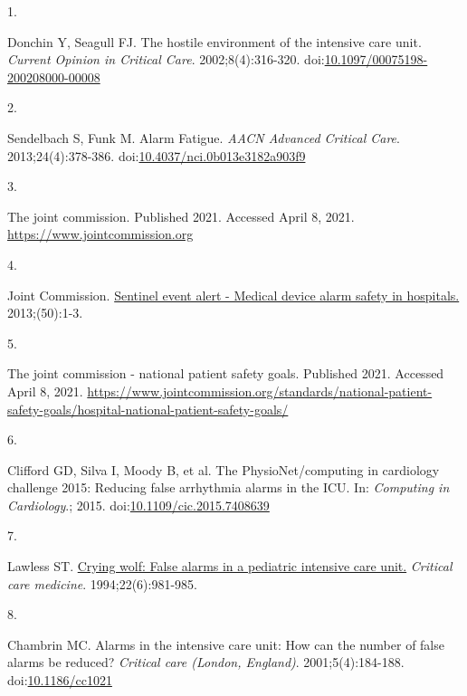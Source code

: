 \documentclass[12pt,twoside]{fmupthesis}
\newlength{\csllabelwidth}
\newlength{\cslhangindent}
\newenvironment{CSLReferences}[2] %
 {%
  \setlength{\parindent}{0pt}
  \ifodd #1 \everypar{\setlength{\hangindent}{\cslhangindent}}\ignorespaces\fi
  \ifnum #2 > 0
  \setlength{\parskip}{#2\baselineskip}
  \fi
 }%
 {}
\newcommand{\CSLLeftMargin}[1]{\parbox[t]{\csllabelwidth}{#1}}
\newcommand{\CSLRightInline}[1]{\parbox[t]{\linewidth - \csllabelwidth}{#1}}
\begin{document}
\hypertarget{refs}{}
\begin{CSLReferences}{0}{0}
\leavevmode{}%
\CSLLeftMargin{1. }
\CSLRightInline{Donchin Y, Seagull FJ. The hostile environment of the intensive care unit. \emph{Current Opinion in Critical Care}. 2002;8(4):316-320. doi:\href{https://doi.org/10.1097/00075198-200208000-00008}{10.1097/00075198-200208000-00008}}

\leavevmode{}%
\CSLLeftMargin{2. }
\CSLRightInline{Sendelbach S, Funk M. Alarm Fatigue. \emph{AACN Advanced Critical Care}. 2013;24(4):378-386. doi:\href{https://doi.org/10.4037/nci.0b013e3182a903f9}{10.4037/nci.0b013e3182a903f9}}

\leavevmode{}%
\CSLLeftMargin{3. }
\CSLRightInline{The joint commission. Published 2021. Accessed April 8, 2021. \url{https://www.jointcommission.org}}

\leavevmode{}%
\CSLLeftMargin{4. }
\CSLRightInline{Joint Commission. \href{https://www.ncbi.nlm.nih.gov/pubmed/23767076}{{Sentinel event alert - Medical device alarm safety in hospitals.}} 2013;(50):1-3.}

\leavevmode{}%
\CSLLeftMargin{5. }
\CSLRightInline{The joint commission - national patient safety goals. Published 2021. Accessed April 8, 2021. \url{https://www.jointcommission.org/standards/national-patient-safety-goals/hospital-national-patient-safety-goals/}}

\leavevmode{}%
\CSLLeftMargin{6. }
\CSLRightInline{Clifford GD, Silva I, Moody B, et al. The PhysioNet/computing in cardiology challenge 2015: Reducing false arrhythmia alarms in the ICU. In: \emph{Computing in Cardiology}.; 2015. doi:\href{https://doi.org/10.1109/cic.2015.7408639}{10.1109/cic.2015.7408639}}

\leavevmode{}%
\CSLLeftMargin{7. }
\CSLRightInline{Lawless ST. \href{https://www.ncbi.nlm.nih.gov/pubmed/8205831}{Crying wolf: False alarms in a pediatric intensive care unit.} \emph{Critical care medicine}. 1994;22(6):981-985.}

\leavevmode{}%
\CSLLeftMargin{8. }
\CSLRightInline{Chambrin MC. Alarms in the intensive care unit: How can the number of false alarms be reduced? \emph{Critical care (London, England)}. 2001;5(4):184-188. doi:\href{https://doi.org/10.1186/cc1021}{10.1186/cc1021}}


\end{CSLReferences}
\end{document}
